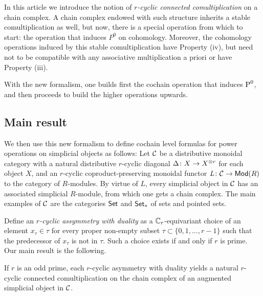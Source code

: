 In this article we introduce the notion of \emph{$r$-cyclic connected comultiplication} on a chain complex.
A chain complex endowed with such structure inherits a stable comultiplication as well, but now, there is a special operation from which to start: the operation that induces $P^0$ on cohomology.
Moreover, the cohomology operations induced by this stable comultiplication have Property (iv), but need not to be compatible with any associative multiplication a priori or have Property (iii).

With the new formalism, one builds first the cochain operation that induces $\operatorname{P}^0$, and then proceeds to build the higher operations upwards.

\subsection{Main result}

We then use this new formalism to define cochain level formulas for power operations on simplicial objects as follows: Let $\mathcal{C}$ be a distributive monoidal category with a natural distributive $r$-cyclic diagonal $\Delta \colon  X\to X^{ \otimes  r}$ for each object $X$, and an $r$-cyclic coproduct-preserving monoidal functor $\operatorname{{\it L}} \colon  \mathcal{C}\to \mathsf{Mod}(R)$ to the category of $R$-modules.
By virtue of $L$, every simplicial object in $\mathcal{C}$ has an associated simplicial $R$-module, from which one gets a chain complex.
The main examples of $\mathcal{C}$ are the categories $\mathsf{Set}$ and $\mathsf{Set}_*$ of sets and pointed sets.

Define an \emph{$r$-cyclic assymmetry with duality} as a $\mathbb{C}_r$-equivariant choice of an element $x_\tau\in \tau$ for every proper non-empty subset $\tau\subset \{0,1,\ldots,r-1\}$ such that the predecessor of $x_\tau$ is not in $\tau$.
Such a choice exists if and only if $r$ is prime.
Our main result is the following.

\begin{theorem}\label{thm:main}
	If $r$ is an odd prime, each $r$-cyclic asymmetry with duality yields a natural $r$-cyclic connected comultiplication on the chain complex of an augmented simplicial object in $\mathcal{C}$.
\end{theorem}


